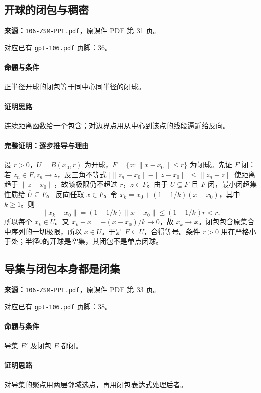 \clearpage\subsection{开球的闭包与稠密}
\textbf{来源：}\texttt{106-ZSM-PPT.pdf}，原课件 PDF 第 31 页。\par
对应已有 \texttt{gpt-106.pdf} 页脚：36。\par
\paragraph{命题与条件}正半径开球的闭包等于同中心同半径的闭球。
\paragraph{证明思路}连续距离函数给一个包含；对边界点用从中心到该点的线段逼近给反向。
\paragraph{完整证明：逐步推导与理由}

设 $r>0$，$U=B(x_0,r)$ 为开球，$F=\{x:\|x-x_0\|\le r\}$ 为闭球。先证 $F$ 闭：若 $z_n\in F,z_n\to z$，反三角不等式 $|\|z_n-x_0\|-\|z-x_0\||\le\|z_n-z\|$ 使距离趋于 $\|z-x_0\|$，故该极限仍不超过 $r$，$z\in F$。由于 $U\subseteq F$ 且 $F$ 闭，最小闭超集性质给 $\overline U\subseteq F$。
反向任取 $x\in F$。令 $x_k=x_0+(1-1/k)(x-x_0)$，其中 $k\ge1$。则
\[\|x_k-x_0\|=(1-1/k)\|x-x_0\|\le(1-1/k)r<r,\]
所以每个 $x_k\in U$。又 $x_k-x=-(x-x_0)/k\to0$，故 $x_k\to x$。闭包包含原集合中序列的一切极限，所以 $x\in\overline U$。于是 $F\subseteq\overline U$，合得等号。条件 $r>0$ 用在严格小于处；半径0的开球是空集，其闭包不是单点闭球。

\clearpage\subsection{导集与闭包本身都是闭集}
\textbf{来源：}\texttt{106-ZSM-PPT.pdf}，原课件 PDF 第 33 页。\par
对应已有 \texttt{gpt-106.pdf} 页脚：38。\par
\paragraph{命题与条件}导集 $E'$ 及闭包 $\overline E$ 都闭。
\paragraph{证明思路}对导集的聚点用两层邻域选点，再用闭包表达式处理后者。

